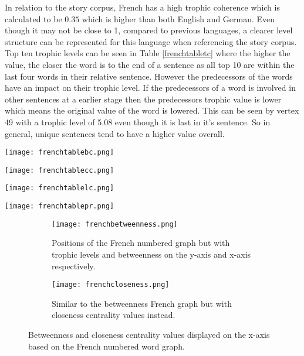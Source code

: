 In relation to the story corpus, French has a high trophic coherence which is calculated to be $0.35$ which is higher than both English and German. Even though it may not be close to 1, compared to previous languages, a clearer level structure can be represented for this language when referencing the story corpus. Top ten trophic levels can be seen in Table \ref{frenchtabletc} where the higher the value, the closer the word is to the end of a sentence as all top 10 are within the last four words in their relative sentence. However the predecessors of the words have an impact on their trophic level. If the predecessors of a word is involved in other sentences at a earlier stage then the predecessors trophic value is lower which means the original value of the word is lowered. This can be seen by vertex 49 with a trophic level of 5.08 even though it is last in it's sentence. So in general, unique sentences tend to have a higher value overall.

\begin{table}[H]
\centering

\begin{subtable}{.27\textwidth}
	\texttt{[image: frenchtablebc.png]}
	\caption{}
	\label{table:frenchtablebc}
\end{subtable}
\hfill
\begin{subtable}{.2\textwidth}
	\centering
	\texttt{[image: frenchtablecc.png]}
	\caption{}
	\label{table:frenchtablecc}
\end{subtable}
\hfill
\begin{subtable}{.2\textwidth}
	\centering
	\texttt{[image: frenchtablelc.png]}
	\caption{}
	\label{table:frenchtablelc}
\end{subtable}
\hfill
\begin{subtable}{.2\textwidth}
	\centering
	\texttt{[image: frenchtablepr.png]}
	\caption{}
	\label{table:frenchtablepr}
\end{subtable}
\caption{}
\end{table}

\begin{figure}[H]
\centering
\begin{subfigure}{.45\textwidth}
	\hspace{-1cm} 
	\texttt{[image: frenchbetweenness.png]}
	\caption{Positions of the French numbered graph but with trophic levels and betweenness on the y-axis and x-axis respectively.}
	\label{fig:frbc}
\end{subfigure}
\hfill
\begin{subfigure}{.45\textwidth}
	\hspace{-1cm} 
	\texttt{[image: frenchcloseness.png]}
	\caption{Similar to the betweenness French graph but with closeness centrality values instead. }
	\label{fig:frcc}
\end{subfigure}
\caption{Betweenness and closeness centrality values displayed on the x-axis based on the French numbered word graph.}
\label{fig:frcentrality}
\end{figure}

